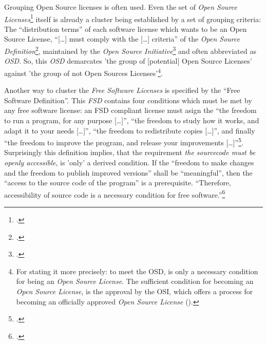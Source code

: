 %
%
%
%
%



Grouping Open Source licenses is often used. Even the set of \emph{Open Source
Li\-cen\-ses}\footcite[cf.][\nopage wp]{OSI2012b} itself is already a cluster
being established by a set of grouping criteria: The \enquote{distribution
terms} of each software license which wants to be an Open Source License,
\enquote{[\ldots] must comply with the [\ldots] criteria} of the \emph{Open
Source Definition}\footcite[cf.][\nopage wp]{OSI2012a}, maintained by the
\emph{Open Source Initiative}\footcite[cf.][\nopage wp]{OSI2012c} and often
abbreviated as \emph{OSD}. So, this \emph{OSD} demarcates 'the group of
[potential] Open Source Licenses' against 'the group of not Open Sources
Licenses'\footnote{For stating it more precisely: to meet the OSD, is only a
necessary condition for being an \emph{Open Source License}. The sufficient
condition for becoming an \emph{Open Source License}, is the approval by the
OSI, which offers a process for becoming an officially approved \emph{Open
Source License} (\cite[cf.][\nopage wp.]{OSI2012d}).}.

Another way to cluster the \emph{Free Software Licenses} is specified by the
\enquote{Free Software Definition}. This \emph{FSD} contains four conditions
which must be met by any free software license: an FSD compliant license must
asign the \enquote{the freedom to run a program, for any purpose [\ldots]},
\enquote{the freedom to study how it works, and adapt it to your needs
[\ldots]}, \enquote{the freedom to redistribute copies [\ldots]}, and finally
\enquote{the freedom to improve the program, and release your improvements
[\ldots]}\footcite[cf.][41]{Stallman1996a}. Surprisingly this definition
implies, that the requirement \emph{the sourcecode must be openly accessible},
is 'only' a derived condition. If the \enquote{freedom to make changes and the
freedom to publish improved versions} shall be \enquote{meaningful}, then the
\enquote{access to the source code of the program} is a prerequisite.
\enquote{Therefore, accessibility of source code is a necessary condition for
free software.}\footcite[cf.][41]{Stallman1996a}

